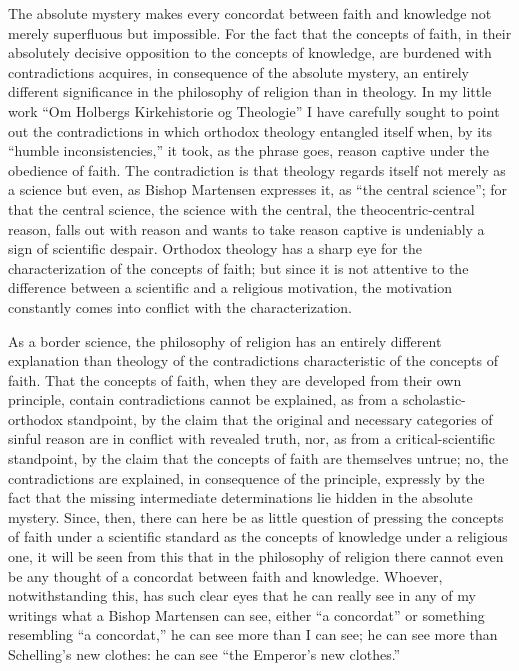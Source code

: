 \documentclass[12pt]{book}
\newcommand{\opage}[1]{\marginnote{\footnotesize\textit{[#1]}}}
\begin{document}
The absolute mystery makes every concordat between faith and knowledge not merely superfluous but impossible. For the fact that the concepts of faith, in their absolutely decisive opposition to the concepts of knowledge, are burdened with contradictions acquires, in consequence of the absolute mystery, an entirely different significance in the philosophy of religion than in theology. In my little work ``Om Holbergs Kirkehistorie og Theologie'' I have carefully sought to point out the contradictions in which orthodox theology entangled itself when, by its ``humble inconsistencies,'' it took, as the phrase goes, reason captive under the obedience of faith. The contradiction is that theology regards itself not merely as a science but even, as Bishop Martensen expresses it, as ``the central science''; for that the central science, the science with the central, the theocentric-central reason, falls out with reason and wants to take reason captive is undeniably a sign of scientific despair. Orthodox theology has a sharp eye for the characterization of the concepts of faith; but since it is not attentive to the difference between a scientific and a religious motivation, the motivation constantly comes into conflict with the characterization.

As a border science, the philosophy of religion has an entirely different explanation than theology of the contradictions characteristic of the concepts of faith. That the concepts of faith, when they are developed from their own principle, contain contradictions cannot be explained, as from a scholastic-orthodox standpoint, by the claim that the original and necessary categories of sinful reason are in conflict with revealed truth, nor, as from a critical-scientific standpoint,
\opage{140}\setcounter{footnote}{0}%
by the claim that the concepts of faith are themselves untrue; no, the contradictions are explained, in consequence of the principle, expressly by the fact that the missing intermediate determinations lie hidden in the absolute mystery. Since, then, there can here be as little question of pressing the concepts of faith under a scientific standard as the concepts of knowledge under a religious one, it will be seen from this that in the philosophy of religion there cannot even be any thought of a concordat between faith and knowledge. Whoever, notwithstanding this, has such clear eyes that he can really see in any of my writings what a Bishop Martensen can see, either ``a concordat'' or something resembling ``a concordat,'' he can see more than I can see; he can see more than Schelling's new clothes: he can see ``the Emperor's new clothes.''
\end{document}
